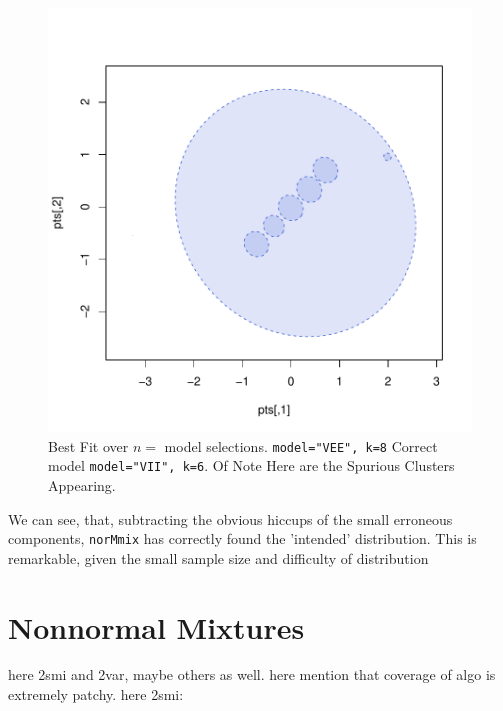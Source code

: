 \begin{figure}[h!]
    \begin{Rgraph}[0.9]
\includegraphics{chapter3-fig214fit}
    \caption{Best Fit over $n=$ model selections. {\tt model="VEE", k=8} Correct
             model {\tt model="VII", k=6}. Of Note Here are the Spurious 
             Clusters Appearing.}%
    \label{fig:MW214bestfit}
    \end{Rgraph}
\end{figure}

We can see, that, subtracting the obvious hiccups of the small erroneous
components, {\tt norMmix} has correctly found the 'intended' 
distribution. This is remarkable, given the small sample size and difficulty of distribution

\clearpage

\section{Nonnormal Mixtures}

here 2smi and 2var, maybe others as well.
here mention that coverage of algo is extremely patchy.
here 2smi:


